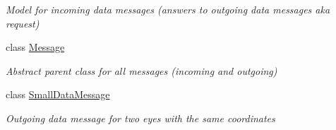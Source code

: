 \begin{DoxyCompactItemize}
\begin{DoxyCompactList}\small\item\em Model for incoming data messages (answers to outgoing data messages aka request) \end{DoxyCompactList}\item 
class \hyperlink{class_web_analyzer_1_1_models_1_1_message_model_1_1_message}{Message}
\begin{DoxyCompactList}\small\item\em Abstract parent class for all messages (incoming and outgoing) \end{DoxyCompactList}\item 
class \hyperlink{class_web_analyzer_1_1_models_1_1_message_model_1_1_small_data_message}{Small\+Data\+Message}
\begin{DoxyCompactList}\small\item\em Outgoing data message for two eyes with the same coordinates \end{DoxyCompactList}\end{DoxyCompactItemize}
